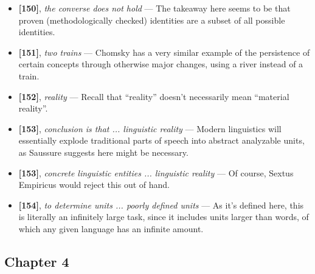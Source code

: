 \documentclass[12pt]{article}
\begin{document}
\begin{itemize}

\item \textbf{[150]}, \textit{the converse does not hold} --- The takeaway here seems to be that proven (methodologically checked) identities are a subset of all possible identities.

\item \textbf{[151]}, \textit{two trains} --- Chomsky has a very similar example of the persistence of certain  concepts through otherwise major changes, using a river instead of a train.

\item \textbf{[152]}, \textit{reality} --- Recall that ``reality'' doesn't necessarily mean ``material reality''.

\item \textbf{[153]}, \textit{conclusion is that ... linguistic reality} --- Modern linguistics will essentially explode traditional parts of speech into abstract analyzable units, as Saussure suggests here might be necessary.

\item \textbf{[153]}, \textit{concrete linguistic entities ... linguistic reality} --- Of course, Sextus Empiricus would reject this out of hand.

\item \textbf{[154]}, \textit{to determine units ... poorly defined units} --- As it's defined here, this is literally an infinitely large task, since it includes units larger than words, of which any given language has an infinite amount.

\end{itemize}

\subsection{Chapter 4}
\end{document}
